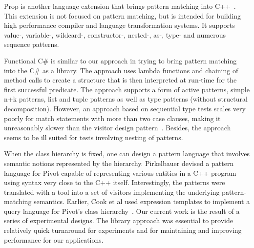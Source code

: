 Prop is another language extension that brings pattern matching into 
C++~\cite{Prop96}. This extension is not focused on pattern 
matching, but is intended for building high performance 
compiler and language transformation systems. It supports value-, variable-, 
wildcard-, constructor-, nested-, as-, type- and numerous sequence patterns.

Functional C\# is similar to our approach in trying to bring pattern matching 
into the C\# as a library\cite{FuncCSharp}. The approach uses lambda functions 
and chaining of method calls to create a structure that is then interpreted at 
run-time for the first successful predicate. The approach supports a form of 
active patterns, simple n+k patterns, list and tuple patterns as well as type 
patterns (without structural decomposition). 
However, an approach based on sequential type tests 
scales very poorly for match statements with more than two case clauses, making 
it unreasonably slower than the visitor design pattern~\cite{TypeSwitch}. Besides, the approach 
seems to be ill suited for tests involving nesting of patterns.

When the class hierarchy is fixed, one can design a pattern language that involves 
semantic notions represented by the hierarchy. Pirkelbauer devised a pattern 
language for Pivot capable of representing various entities in a C++ program using syntax very close to the C++ itself. 
Interestingly, the patterns were translated with a tool into a set of visitors 
implementing the underlying pattern-matching semantics\cite{PirkelbauerThesis}. 
Earlier, Cook et al used expression templates to implement a query language for 
Pivot's class hierarchy~\cite{iql04}. Our current work is the result of a series 
of experimental designs. The library approach was essential to provide 
relatively quick turnaround for experiments and for maintaining and improving 
performance for our applications.
